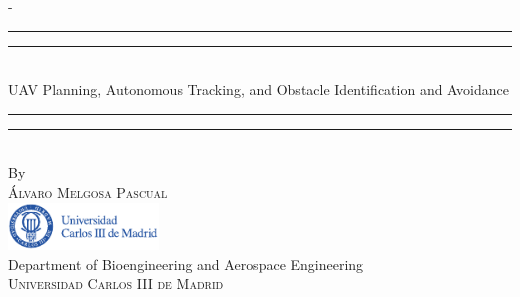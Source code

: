 %
%
% 
%
%
\begin{titlingpage}
\begin{SingleSpace}
\calccentering{\unitlength} 
\begin{adjustwidth*}{\unitlength}{-\unitlength}
\vspace*{13mm}
\begin{center}
\rule[0.5ex]{\linewidth}{2pt}\vspace*{-\baselineskip}\vspace*{3.2pt}
\rule[0.5ex]{\linewidth}{1pt}\\[\baselineskip]
{\sc \huge UAV Planning, Autonomous Tracking, and Obstacle Identification and Avoidance}\\[4mm]
\rule[0.5ex]{\linewidth}{1pt}\vspace*{-\baselineskip}\vspace{3.2pt}
\rule[0.5ex]{\linewidth}{2pt}\\
\vspace{1cm}
{\large By}\\
\vspace{0.5cm}
{\large\textsc{\'Alvaro Melgosa Pascual}}\\
\vspace{2cm}
\includegraphics[trim={0 0 2.13cm 0},clip, width=0.3\textwidth]{logos/logoUC3M.pdf}\\
\vspace{1cm}
{\large Department of Bioengineering and Aerospace Engineering\\
\textsc{Universidad Carlos III de Madrid}}\\

\end{center}
\end{adjustwidth*}
\end{SingleSpace}
\end{titlingpage}
